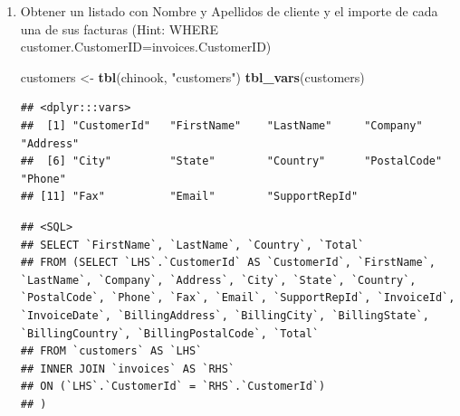 \documentclass[
]{book}
\newenvironment{Shaded}{\begin{snugshade}}{\end{snugshade}}
\newcommand{\DataTypeTok}[1]{\textcolor[rgb]{0.13,0.29,0.53}{#1}}
\newcommand{\KeywordTok}[1]{\textcolor[rgb]{0.13,0.29,0.53}{\textbf{#1}}}
\newcommand{\NormalTok}[1]{#1}
\newcommand{\OperatorTok}[1]{\textcolor[rgb]{0.81,0.36,0.00}{\textbf{#1}}}
\newcommand{\StringTok}[1]{\textcolor[rgb]{0.31,0.60,0.02}{#1}}
\begin{document}
\begin{enumerate}
\def\labelenumi{\arabic{enumi}.}
\setcounter{enumi}{3}
\item
  Obtener un listado con Nombre y Apellidos de cliente y el importe de cada una de sus facturas
  (Hint: WHERE customer.CustomerID=invoices.CustomerID)

\begin{Shaded}
\begin{Highlighting}[]
\NormalTok{customers <-}\StringTok{ }\KeywordTok{tbl}\NormalTok{(chinook, }\StringTok{"customers"}\NormalTok{)}
\KeywordTok{tbl_vars}\NormalTok{(customers) }
\end{Highlighting}
\end{Shaded}

\begin{verbatim}
## <dplyr:::vars>
##  [1] "CustomerId"   "FirstName"    "LastName"     "Company"      "Address"     
##  [6] "City"         "State"        "Country"      "PostalCode"   "Phone"       
## [11] "Fax"          "Email"        "SupportRepId"
\end{verbatim}

\begin{Shaded}
\end{Shaded}

\begin{verbatim}
## <SQL>
## SELECT `FirstName`, `LastName`, `Country`, `Total`
## FROM (SELECT `LHS`.`CustomerId` AS `CustomerId`, `FirstName`, `LastName`, `Company`, `Address`, `City`, `State`, `Country`, `PostalCode`, `Phone`, `Fax`, `Email`, `SupportRepId`, `InvoiceId`, `InvoiceDate`, `BillingAddress`, `BillingCity`, `BillingState`, `BillingCountry`, `BillingPostalCode`, `Total`
## FROM `customers` AS `LHS`
## INNER JOIN `invoices` AS `RHS`
## ON (`LHS`.`CustomerId` = `RHS`.`CustomerId`)
## )
\end{verbatim}

\begin{Shaded}
\end{Shaded}


\end{enumerate}
\end{document}
